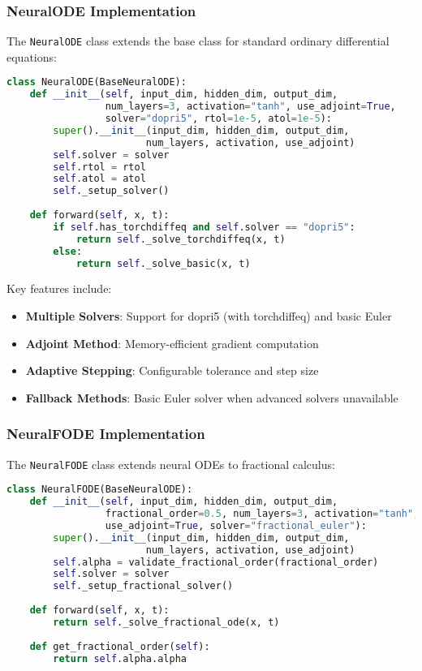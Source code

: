 \subsubsection{NeuralODE Implementation}

The \texttt{NeuralODE} class extends the base class for standard ordinary differential equations:

\begin{lstlisting}[language=Python, caption=NeuralODE Implementation]
class NeuralODE(BaseNeuralODE):
    def __init__(self, input_dim, hidden_dim, output_dim,
                 num_layers=3, activation="tanh", use_adjoint=True,
                 solver="dopri5", rtol=1e-5, atol=1e-5):
        super().__init__(input_dim, hidden_dim, output_dim, 
                        num_layers, activation, use_adjoint)
        self.solver = solver
        self.rtol = rtol
        self.atol = atol
        self._setup_solver()
    
    def forward(self, x, t):
        if self.has_torchdiffeq and self.solver == "dopri5":
            return self._solve_torchdiffeq(x, t)
        else:
            return self._solve_basic(x, t)
\end{lstlisting}

Key features include:
\begin{itemize}
    \item \textbf{Multiple Solvers}: Support for dopri5 (with torchdiffeq) and basic Euler
    \item \textbf{Adjoint Method}: Memory-efficient gradient computation
    \item \textbf{Adaptive Stepping}: Configurable tolerance and step size
    \item \textbf{Fallback Methods}: Basic Euler solver when advanced solvers unavailable
\end{itemize}

\subsubsection{NeuralFODE Implementation}

The \texttt{NeuralFODE} class extends neural ODEs to fractional calculus:

\begin{lstlisting}[language=Python, caption=NeuralFODE Implementation]
class NeuralFODE(BaseNeuralODE):
    def __init__(self, input_dim, hidden_dim, output_dim,
                 fractional_order=0.5, num_layers=3, activation="tanh",
                 use_adjoint=True, solver="fractional_euler"):
        super().__init__(input_dim, hidden_dim, output_dim, 
                        num_layers, activation, use_adjoint)
        self.alpha = validate_fractional_order(fractional_order)
        self.solver = solver
        self._setup_fractional_solver()
    
    def forward(self, x, t):
        return self._solve_fractional_ode(x, t)
    
    def get_fractional_order(self):
        return self.alpha.alpha
\end{lstlisting}

